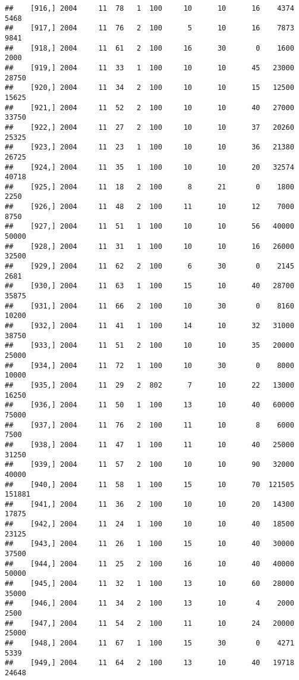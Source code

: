 \documentclass{article}\usepackage[]{graphicx}\usepackage[]{color}
\makeatletter
\newenvironment{kframe}{%
 \def\at@end@of@kframe{}%
 \ifinner\ifhmode%
  \def\at@end@of@kframe{\end{minipage}}%
  \begin{minipage}{\columnwidth}%
 \fi\fi%
 \def\FrameCommand##1{\hskip\@totalleftmargin \hskip-\fboxsep
 \colorbox{shadecolor}{##1}\hskip-\fboxsep
     \hskip-\linewidth \hskip-\@totalleftmargin \hskip\columnwidth}%
 \MakeFramed {\advance\hsize-\width
   \@totalleftmargin\z@ \linewidth\hsize
   \@setminipage}}%
 {\par\unskip\endMakeFramed%
 \at@end@of@kframe}
\newenvironment{knitrout}{}{} %
\makeatother
\begin{document}
\begin{knitrout}
\begin{kframe}
\begin{verbatim}
##    [916,] 2004     11  78   1  100     10      10      16    4374    5468
##    [917,] 2004     11  76   2  100      5      10      16    7873    9841
##    [918,] 2004     11  61   2  100     16      30       0    1600    2000
##    [919,] 2004     11  33   1  100     10      10      45   23000   28750
##    [920,] 2004     11  34   2  100     10      10      15   12500   15625
##    [921,] 2004     11  52   2  100     10      10      40   27000   33750
##    [922,] 2004     11  27   2  100     10      10      37   20260   25325
##    [923,] 2004     11  23   1  100     10      10      36   21380   26725
##    [924,] 2004     11  35   1  100     10      10      20   32574   40718
##    [925,] 2004     11  18   2  100      8      21       0    1800    2250
##    [926,] 2004     11  48   2  100     11      10      12    7000    8750
##    [927,] 2004     11  51   1  100     10      10      56   40000   50000
##    [928,] 2004     11  31   1  100     10      10      16   26000   32500
##    [929,] 2004     11  62   2  100      6      30       0    2145    2681
##    [930,] 2004     11  63   1  100     15      10      40   28700   35875
##    [931,] 2004     11  66   2  100     10      30       0    8160   10200
##    [932,] 2004     11  41   1  100     14      10      32   31000   38750
##    [933,] 2004     11  51   2  100     10      10      35   20000   25000
##    [934,] 2004     11  72   1  100     10      30       0    8000   10000
##    [935,] 2004     11  29   2  802      7      10      22   13000   16250
##    [936,] 2004     11  50   1  100     13      10      40   60000   75000
##    [937,] 2004     11  76   2  100     11      10       8    6000    7500
##    [938,] 2004     11  47   1  100     11      10      40   25000   31250
##    [939,] 2004     11  57   2  100     10      10      90   32000   40000
##    [940,] 2004     11  58   1  100     15      10      70  121505  151881
##    [941,] 2004     11  36   2  100     10      10      20   14300   17875
##    [942,] 2004     11  24   1  100     10      10      40   18500   23125
##    [943,] 2004     11  26   1  100     15      10      40   30000   37500
##    [944,] 2004     11  25   2  100     16      10      40   40000   50000
##    [945,] 2004     11  32   1  100     13      10      60   28000   35000
##    [946,] 2004     11  34   2  100     13      10       4    2000    2500
##    [947,] 2004     11  54   2  100     11      10      24   20000   25000
##    [948,] 2004     11  67   1  100     15      30       0    4271    5339
##    [949,] 2004     11  64   2  100     13      10      40   19718   24648

\end{verbatim}
\end{kframe}
\end{knitrout}
\end{document}

